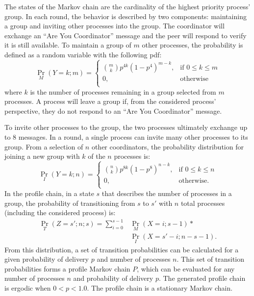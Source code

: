 The states of the Markov chain are the cardinality of the highest priority process' group.
In each round, the behavior is described by two components: maintaining a group and inviting other processes into the group.
The coordinator will exchange an ``Are You Coordinator'' message and the peer will respond to verify it is still available.
To maintain a group of $m$ other processes, the probability is defined as a random variable with the following \ac{pdf}:
\begin{equation}
 \Pr_{M}(Y=k; m) =
   \begin{cases}
    \binom{m}{k} p^{4k}(1-p^4)^{m-k}, & \text{if } 0 \leq k \leq m \\
    0,                                & \text{otherwise} \\
  \end{cases}
\end{equation}%
where $k$ is the number of processes remaining in a group selected from $m$ processes.
A process will leave a group if, from the considered process' perspective, they do not respond to an ``Are You Coordinator'' message.

To invite other processes to the group, the two processes ultimately exchange up to 8 messages.
In a round, a single process can invite many other processes to its group.
From a selection of $n$ other coordinators, the probability distribution for joining a new group with $k$ of the $n$ processes is:
\begin{equation}
    \Pr_{I}(Y=k; n) =
    \begin{cases}
        \binom{n}{k} p^{8k}(1-p^8)^{n-k}, & \text{if } 0 \leq k \leq n \\
        0,                                & \text{otherwise.} \\
    \end{cases}
\end{equation}
In the profile chain, in a state $s$ that describes the number of processes in a group, the probability of transitioning from $s$ to $s'$ with $n$ total processes (including the considered process) is:
\begin{align} \Pr_{T}(Z=s'; n; s) = \sum_{i=0}^{s-1} &\Pr_{M}(X=i; s-1) *
\nonumber \\ &\Pr_{I}(X=s'-i; n-s-1).\end{align}
From this distribution, a set of transition probabilities can be calculated for a given probability of delivery $p$ and number of processes $n$.
This set of transition probabilities forms a profile Markov chain $P$, which can be evaluated for any number of processes $n$ and probability of delivery $p$.
The generated profile chain is ergodic when $0<p<1.0$. The profile chain is a stationary Markov chain.

